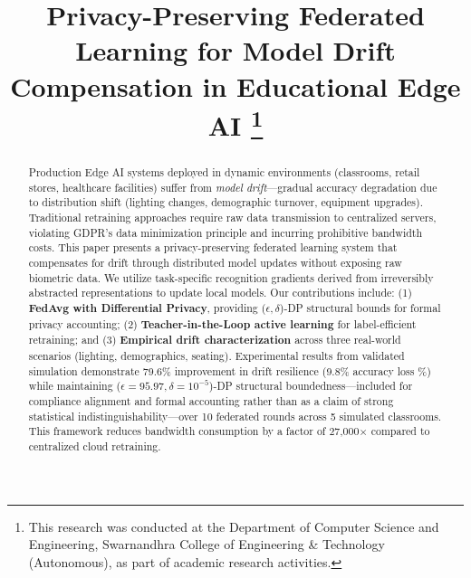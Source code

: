 \documentclass[conference]{IEEEtran}
\begin{document}
\title{Privacy-Preserving Federated Learning for Model Drift Compensation in Educational Edge AI
\thanks{This research was conducted at the Department of Computer Science and Engineering, Swarnandhra College of Engineering \& Technology (Autonomous), as part of academic research activities.}
}

\author{
}

\maketitle

\begin{abstract}
Production Edge AI systems deployed in dynamic environments (classrooms, retail stores, healthcare facilities) suffer from \textit{model drift}—gradual accuracy degradation due to distribution shift (lighting changes, demographic turnover, equipment upgrades). Traditional retraining approaches require raw data transmission to centralized servers, violating GDPR's data minimization principle and incurring prohibitive bandwidth costs. This paper presents a privacy-preserving federated learning system that compensates for drift through distributed model updates without exposing raw biometric data. We utilize task-specific recognition gradients derived from irreversibly abstracted representations to update local models. Our contributions include: (1) \textbf{FedAvg with Differential Privacy}, providing ($\epsilon, \delta$)-DP structural bounds for formal privacy accounting; (2) \textbf{Teacher-in-the-Loop active learning} for label-efficient retraining; and (3) \textbf{Empirical drift characterization} across three real-world scenarios (lighting, demographics, seating). Experimental results from validated simulation demonstrate 79.6\% improvement in drift resilience (9.8\% accuracy loss \%) while maintaining ($\epsilon=95.97, \delta=10^{-5}$)-DP structural boundedness—included for compliance alignment and formal accounting rather than as a claim of strong statistical indistinguishability—over 10 federated rounds across 5 simulated classrooms. This framework reduces bandwidth consumption by a factor of 27,000$\times$ compared to centralized cloud retraining.
\end{abstract}
\end{document}
